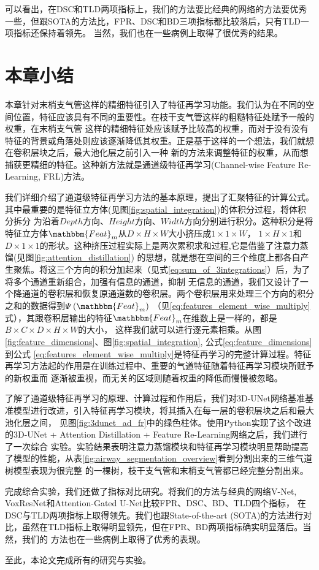 可以看出，在DSC和TLD两项指标上，我们的方法要比经典的网络的方法要优秀一些，但跟SOTA的方法比，FPR、DSC和BD三项指标都比较落后，只有TLD一项指标还保持着领先。
当然，我们也在一些病例上取得了很优秀的结果。


\section{本章小结}

本章针对末梢支气管这样的精细特征引入了特征再学习功能。我们认为在不同的空间位置，特征应该具有不同的重要性。在枝干支气管这样的粗糙特征处赋予一般的权重，在末梢支气管
这样的精细特征处应该赋予比较高的权重，而对于没有没有特征的背景或角落处则应该逐渐降低其权重。正是基于这样的一个想法，我们就想在卷积层块之后，最大池化层之前引入一种
新的方法来调整特征的权重，从而想捕获更精细的特征。这种新方法就是通道级特征再学习(Channel-wise Feature Re-Learning, FRL)方法。

我们详细介绍了通道级特征再学习方法的基本原理，提出了汇聚特征的计算公式。其中最重要的是特征立方体(见图\ref{fig:spatial_integration})的体积分过程，将体积分拆分
为沿着$Depth$方向、$Height$方向、$Width$方向分别进行积分。这种积分是将特征立方体$\mathbbm{Feat}_m$从$D \times H \times W$大小挤压成$1 \times 1 \times W$，
$1 \times H \times 1$和$D \times 1 \times 1$的形状。这种挤压过程实际上是两次累积求和过程,它是借鉴了注意力蒸馏(见图\ref{fig:attention_distillation})
的思想，就是想在空间的三个维度上都各自产生聚焦。将这三个方向的积分加起来（见式\ref{eq:sum_of_3integrations}）后，为了将多个通道重新组合，加强有信息的通道，抑制
无信息的通道，我们又设计了一个降通道的卷积层和恢复原通道数的卷积层。两个卷积层用来处理三个方向的积分之和的数据得到$\varPsi\left(\mathbbm{Feat}_m\right)$
（见\ref{eq:features_element_wise_multiply}式），其跟卷积层输出的特征$\mathbbm{Feat}_m$在维数上是一样的，都是$B \times C \times D \times H \times W$的大小，
这样我们就可以进行逐元素相乘。从图\ref{fig:feature_dimensions}、图\ref{fig:spatial_integration}, 公式\ref{eq:feature_dimensions}到公式
\ref{eq:features_element_wise_multiply}是特征再学习的完整计算过程。特征再学习方法起的作用是在训练过程中、重要的气道特征随着特征再学习模块所赋予的新权重而
逐渐被重视，而无关的区域则随着权重的降低而慢慢被忽略。

了解了通道级特征再学习的原理、计算过程和作用后，我们对3D-UNet网络基准基准模型进行改进，引入特征再学习模块，将其插入在每一层的卷积层块之后和最大池化层之间，
见图\ref{fig:3dunet_ad_fr}中的绿色柱体。使用Python实现了这个改进的3D-UNet + Attention Distillation + Feature Re-Learning网络之后，我们进行了一次综合
实验。实验结果表明注意力蒸馏模块和特征再学习模块明显帮助提高了模型的性能，从表\ref{fig:airway_segmentation_overview}看到分割出来的三维气道树模型表现为很完整
的一棵树，枝干支气管和末梢支气管都已经完整分割出来。

完成综合实验，我们还做了指标对比研究。将我们的方法与经典的网络V-Net, VoxResNet和Attention-Gated U-Net比较FPR、DSC、BD、TLD四个指标，
在DSC与TLD两项指标上取得领先。我们也跟State-of-the-art (SOTA)的方法进行对比，虽然在TLD指标上取得明显领先，但在FPR、BD两项指标确实明显落后。当然，我们的
方法也在一些病例上取得了优秀的表现。

至此，本论文完成所有的研究与实验。